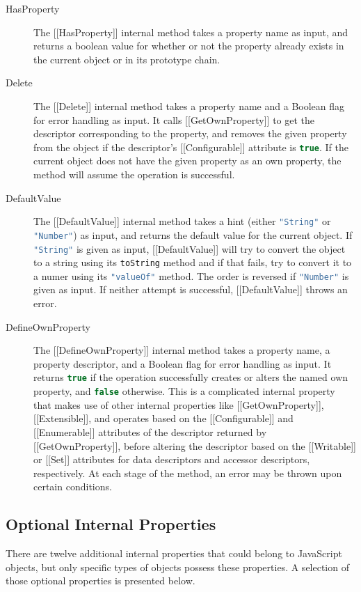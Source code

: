 \documentclass[a4paper,11pt,twoside]{report}
\def\jsinline{\lstinline[language=JavaScript, basicstyle=\small]}%\end{lstlisting}
\begin{document}
\begin{description}
\item[HasProperty] The [[HasProperty]] internal method takes a property name as input, and returns a boolean value for whether or not the property already exists in the current object or in its prototype chain.

\item[Delete] The [[Delete]] internal method takes a property name and a Boolean flag for error handling as input. It calls [[GetOwnProperty]] to get the descriptor corresponding to the property, and removes the given property from the object if the descriptor's [[Configurable]] attribute is \jsinline|true|. If the current object does not have the given property as an own property, the method will assume the operation is successful.

\item[DefaultValue] The [[DefaultValue]] internal method takes a hint (either \jsinline|"String"| or \jsinline|"Number"|) as input, and returns the default value for the current object. If \jsinline|"String"| is given as input, [[DefaultValue]] will try to convert the object to a string using its \jsinline|toString| method and if that fails, try to convert it to a numer using its \jsinline|"valueOf"| method. The order is reversed if \jsinline|"Number"| is given as input. If neither attempt is successful, [[DefaultValue]] throws an error.

\item[DefineOwnProperty] The [[DefineOwnProperty]] internal method takes a property name, a property descriptor, and a Boolean flag for error handling as input. It returns \jsinline|true| if the operation successfully creates or alters the named own property, and \jsinline|false| otherwise. This is a complicated internal property that makes use of other internal properties like [[GetOwnProperty]], [[Extensible]], and operates based on the [[Configurable]] and [[Enumerable]] attributes of the descriptor returned by [[GetOwnProperty]], before altering the descriptor based on the [[Writable]] or [[Set]] attributes for data descriptors and accessor descriptors, respectively. At each stage of the method, an error may be thrown upon certain conditions.
\end{description}

\subsection{Optional Internal Properties}\label{sec:opip}
There are twelve additional internal properties that could belong to JavaScript objects, but only specific types of objects possess these properties. A selection of those optional properties is presented below.
\end{document}
